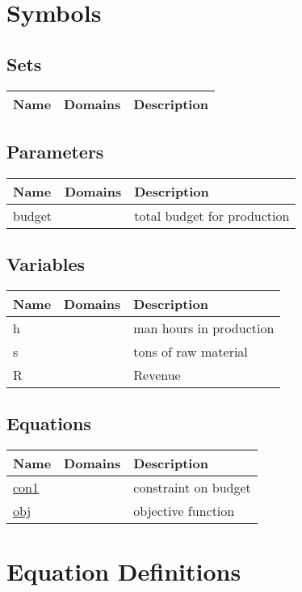 \documentclass[11pt]{article}
\begin{document}
\section*{Symbols}
\subsection*{Sets}
\begin{tabularx}{\textwidth}{| l | l | X |} 
\hline 
\textbf{Name} & \textbf{Domains} & \textbf{Description}\\ 
\hline 
\endhead 
\hline 
\end{tabularx}
\subsection*{Parameters}
\begin{tabularx}{\textwidth}{| l | l | X |} 
\hline 
\textbf{Name} & \textbf{Domains} & \textbf{Description}\\ 
\hline 
\endhead 
budget &  & total budget for production \\ 
\hline 
\end{tabularx}
\subsection*{Variables}
\begin{tabularx}{\textwidth}{| l | l | X |} 
\hline 
\textbf{Name} & \textbf{Domains} & \textbf{Description}\\ 
\hline 
\endhead 
h &  & man hours in production \\ 
s &  & tons of raw material \\ 
R &  & Revenue \\ 
\hline 
\end{tabularx}
\subsection*{Equations}
\begin{tabularx}{\textwidth}{| l | l | X |} 
\hline 
\textbf{Name} & \textbf{Domains} & \textbf{Description}\\ 
\hline 
\endhead 
\hyperref[con1]{con1}  &  & constraint on budget \\ 
\hyperref[obj]{obj}  &  & objective function \\ 
\hline 
\end{tabularx}
\section*{Equation Definitions}
\end{document}
